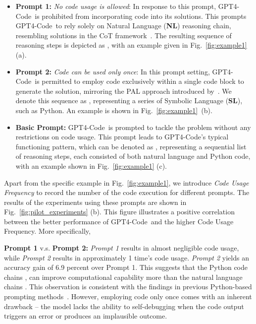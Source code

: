 \documentclass{article} \usepackage{iclr2023_conference,times}
\newcommand{\gptcode}{GPT4-Code}
\begin{document}
\begin{itemize}
\item 
\textbf{Prompt 1: } \textit{No code usage is allowed}: In response to this prompt, \gptcode~is prohibited from incorporating code into its solutions. This prompts \gptcode~to rely solely on Natural Language (\textbf{NL}) reasoning chain, resembling solutions in the CoT framework~\citep{wei2022chain}. The resulting sequence of reasoning steps is depicted as , with an example given in Fig.~\ref{fig:example1} (a).

\item
\textbf{Prompt 2:} \textit{Code can be used only once}: In this prompt setting, \gptcode~is permitted to employ code exclusively within a single code block to generate the solution, mirroring the PAL approach introduced by~\citet{gao2023pal}. We denote this sequence as , representing a series of Symbolic Language (\textbf{SL}), such as Python. An example is shown in Fig.~\ref{fig:example1}~(b).

\item 
\textbf{Basic Prompt:} \gptcode~is prompted to tackle the problem without any restrictions on code usage. This prompt leads to \gptcode's typical functioning pattern, which can be denoted as , representing a sequential list of reasoning steps, each consisted of both natural language and Python code, with an example shown in Fig.~\ref{fig:example1} (c). 

\end{itemize}





Apart from the specific example in Fig.~\ref{fig:example1}, we introduce \textit{Code Usage Frequency} to record the number of the code execution for different prompts. The results of the experiments using these prompts are shown in Fig.~\ref{fig:pilot_experiments} (b). This figure illustrates a positive correlation between the better performance of \gptcode~and the higher Code Usage Frequency. More specifically,

\textbf{Prompt 1} v.s. \textbf{Prompt 2:} \textit{Prompt 1} 
 results in almost negligible code usage, while \textit{Prompt 2} results in approximately 1 time's 
code usage. \textit{Prompt 2} yields an accuracy gain of 6.9 percent over Prompt 1. This suggests that the Python code chains , can improve computational capability more than the natural language chains . This observation is consistent with the findings in previous Python-based prompting methods~\citep{gao2023pal, chen2022program}. However, employing code only once comes with an inherent drawback – the model lacks the ability to self-debugging when the code output triggers an error or produces an implausible outcome.
\end{document}
